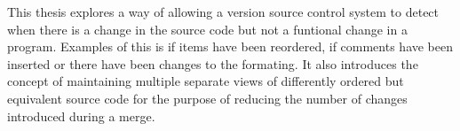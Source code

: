 This thesis explores a way of allowing a version source control system to detect when there is a change in the source code but not a funtional change in a program.  Examples of this is if items have been reordered, if comments have been inserted or there have been changes to the formating.  It also introduces the concept of maintaining multiple separate views of differently ordered but equivalent source code for the purpose of reducing the number of changes introduced during a merge. 


